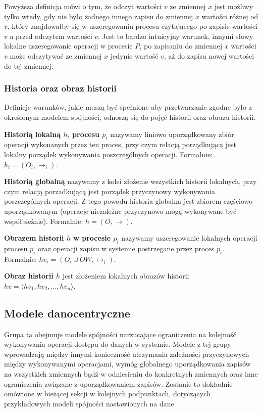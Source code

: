 Powyższa definicja mówi o tym, że odczyt wartości $ v $ ze zmiennej $ x $ jest możliwy tylko wtedy, gdy nie było żadnego innego zapisu do zmiennej $ x $ wartości różnej od $ v $, który znajdowałby się w uszeregowaniu procesu czytającego po zapisie wartości $ v $ a przed odczytem wartości $ v $. Jest to bardzo intuicyjny warunek, innymi słowy lokalne uszeregowanie operacji w procesie $ P_i $ po zapisaniu do zmiennej $ x $ wartości $ v $ może odczytywać ze zmiennej $ x $ jedynie wartość $ v $, aż do zapisu nowej wartości do tej zmiennej.

\subsubsection{Historia oraz obraz historii}


Definicje warunków, jakie muszą być spełnione aby przetwarzanie zgodne było z określonym modelem spójności, odnoszą się do pojęć historii oraz obrazu historii.

\textbf{Historią lokalną $ h_i $ procesu $ p_i $} nazywamy liniowo uporządkowany zbiór operacji wykonanych przez ten proces, przy czym relacją porządkującą jest lokalny porządek wykonywania poszczególnych operacji. Formalnie: $ h_i = (O_i, \rightarrow_i) $.

\textbf{Historią globalną} nazywamy z kolei złożenie wszystkich historii lokalnych, przy czym relacją porzadkującą jest porządek przyczynowy wykonywania poszczególnych operacji. Z tego powodu historia globalna jest zbiorem częściowo uporządkowanym (operacje niezależne przyczynowo mogą wykonywane być współbieżnie). Formalnie: $ h = (O, \rightarrow) $.

\textbf{Obrazem historii $ h $ w procesie $ p_i $} nazywamy uszeregowanie lokalnych operacji procesu $ p_i $ oraz operacji zapisu w systemie postrzegane przez proces $ p_i $. Formalnie: ${ hv_i = (O_i \cup OW, \mapsto_i) }$.

\textbf{Obraz historii $ h $} jest złożeniem lokalnych obrazów historii $ hv = \langle hv_1, hv_2, ..., hv_n \rangle $.

\subsection{Modele danocentryczne}

Grupa ta obejmuje modele spójności narzucające ograniczenia na kolejność wykonywania operacji dostępu do danych w systemie. Modele z tej grupy wprowadzają między innymi konieczność utrzymania zależności przyczynowych między wykonywanymi operacjami, wymóg globalnego uporządkowania zapisów na wszystkich zmiennych bądź w odniesieniu do konkretnych zmiennych oraz inne ograniczenia związane z uporządkowaniem zapisów. Zostanie to dokładnie omówione w bieżącej sekcji w kolejnych podpunktach, dotyczących przykładowych modeli spójności nastawionych na dane.

